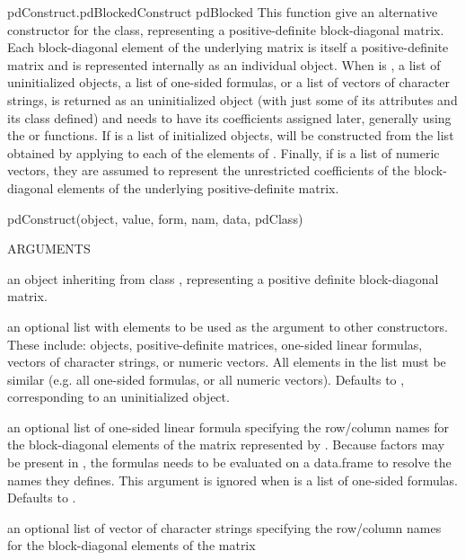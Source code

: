 \documentclass[pdftex]{article} \usepackage{url,graphicx}
\begin{document}
\begin{Helpfile}{pdConstruct.pdBlocked}{Construct pdBlocked}
This function give an alternative constructor for the 
class, representing a positive-definite block-diagonal matrix. Each
block-diagonal element of the underlying  matrix is itself a
positive-definite matrix and is represented internally as an
individual  object. When  is
, a list of uninitialized  objects, a
list of one-sided formulas, or a list of vectors of character strings,
 is returned as an uninitialized  object
(with just some of its attributes and its class defined) and needs to
have its coefficients assigned later, generally using the 
or  functions. If  is a list of  initialized
 objects,  will be constructed from the list
obtained by applying  to each of the 
elements of . Finally, if  is a list of
numeric vectors, they are assumed to represent the unrestricted
coefficients of the block-diagonal elements of the  underlying
positive-definite matrix.
\begin{Example}
pdConstruct(object, value, form, nam, data, pdClass)
\end{Example}
\begin{Argument}{ARGUMENTS}
\item[\Co{object:}]
an object inheriting from class ,
representing a positive definite block-diagonal matrix.
\item[\Co{value:}]
an optional list with elements to be used as the
 argument to other  constructors. These
include:  objects, positive-definite
matrices, one-sided linear formulas, vectors of character strings, or
numeric vectors. All elements in the list must be similar (e.g. all
one-sided formulas, or all numeric vectors). Defaults to
, corresponding to an uninitialized object.
\item[\Co{form:}]
an optional list of one-sided linear formula specifying the
row/column names for the block-diagonal elements of the matrix
represented by . Because factors may be present in
, the formulas needs to be evaluated on a data.frame to
resolve the names they defines. This argument is ignored when
 is a list of one-sided formulas. Defaults to .
\item[\Co{nam:}]
an optional list of vector of character strings specifying the
row/column names for the block-diagonal elements of the matrix

\end{Argument}
\end{Helpfile}
\end{document}
